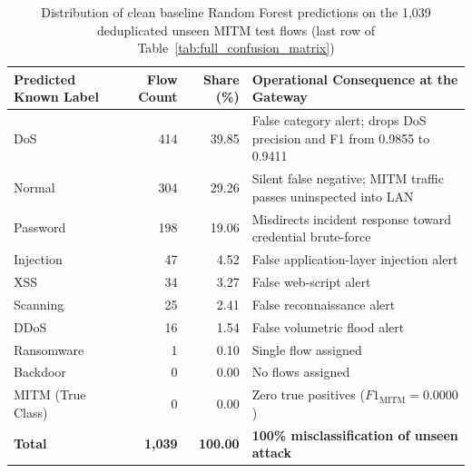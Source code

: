 \begin{table}[htbp]
\centering
\small
\renewcommand{\arraystretch}{1.25}
\caption{Distribution of clean baseline Random Forest predictions on the 1{,}039 deduplicated unseen MITM test flows (last row of Table~\ref{tab:full_confusion_matrix})}
\label{tab:mitm_misclassification}
\begin{tabular}{|l|r|r|p{6.8cm}|}
\hline
\textbf{Predicted Known Label} & \textbf{Flow Count} & \textbf{Share (\%)} & \textbf{Operational Consequence at the Gateway} \\ \hline
DoS        & 414 & 39.85 & False category alert; drops DoS precision and F1 from 0.9855 to 0.9411 \\
Normal     & 304 & 29.26 & Silent false negative; MITM traffic passes uninspected into LAN \\
Password   & 198 & 19.06 & Misdirects incident response toward credential brute-force \\
Injection  & 47  & 4.52  & False application-layer injection alert \\
XSS        & 34  & 3.27  & False web-script alert \\
Scanning   & 25  & 2.41  & False reconnaissance alert \\
DDoS       & 16  & 1.54  & False volumetric flood alert \\
Ransomware & 1   & 0.10  & Single flow assigned \\
Backdoor   & 0   & 0.00  & No flows assigned \\
MITM (True Class) & 0 & 0.00 & Zero true positives ($F1_{\text{MITM}} = 0.0000$) \\ \hline
\textbf{Total} & \textbf{1{,}039} & \textbf{100.00} & \textbf{100\% misclassification of unseen attack} \\ \hline
\end{tabular}
\end{table}

